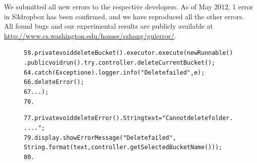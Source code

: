 We submitted all \newbugs new errors to the respective developers. As of May 2012, 
1 error in S3dropbox has been confirmed, and we have reproduced all the other errors.
All found bugs and our experimental results are
publicly available at \url{http://www.cs.washington.edu/homes/szhang/guierror/}.




\begin{figure}[t]
\hspace{4mm}{In class: com.tomczarniecki.s3.gui.DeleteBucketAction}
\vspace{-2mm}
\begin{CodeOut}
\begin{alltt}
59.private void deleteBucket() .    executor.execute(new Runnable() .        public void run() .            try .                controller.deleteCurrentBucket();
64.            {\ttrcb} catch (Exception e) .                logger.info("Delete failed", e);
66.                deleteError(); 
67.            .       .    \ttrcb);
70.\ttrcb

77.private void deleteError() .    String text = "Cannot delete folder .....";
79.    display.showErrorMessage("Delete failed", 
        String.format(text, controller.getSelectedBucketName())); 
80.\ttrcb
\end{alltt}
\end{CodeOut}
\vspace*{-15pt}
\end{figure}

